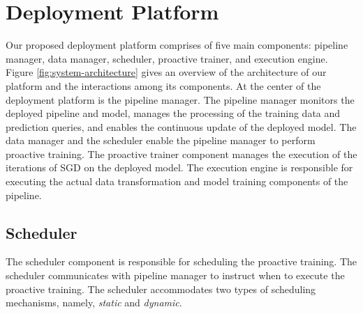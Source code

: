 \section{Deployment Platform} \label{sec:system-architecture}
Our proposed deployment platform comprises of five main components: pipeline manager, data manager, scheduler, proactive trainer, and execution engine.
Figure \ref{fig:system-architecture} gives an overview of the architecture of our platform and the interactions among its components.
At the center of the deployment platform is the pipeline manager.
The pipeline manager monitors the deployed pipeline and model, manages the processing of the training data and prediction queries, and enables the continuous update of the deployed model.
The data manager and the scheduler enable the pipeline manager to perform proactive training.
The proactive trainer component manages the execution of the iterations of SGD on the deployed model.
The execution engine is responsible for executing the actual data transformation and model training components of the pipeline.

\subsection{Scheduler}\label{scheduler}
The scheduler component is responsible for scheduling the proactive training.
The scheduler communicates with pipeline manager to instruct when to execute the proactive training.
The scheduler accommodates two types of scheduling mechanisms, namely, \textit{static} and \textit{dynamic}.

